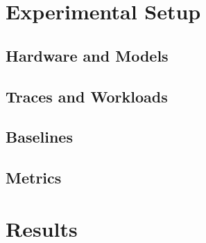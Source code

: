 \documentclass{article}
\begin{document}
\section{Experimental Setup}


\subsection{Hardware and Models}

\subsection{Traces and Workloads}


\subsection{Baselines}

\subsection{Metrics}

\section{Results}
\end{document}
